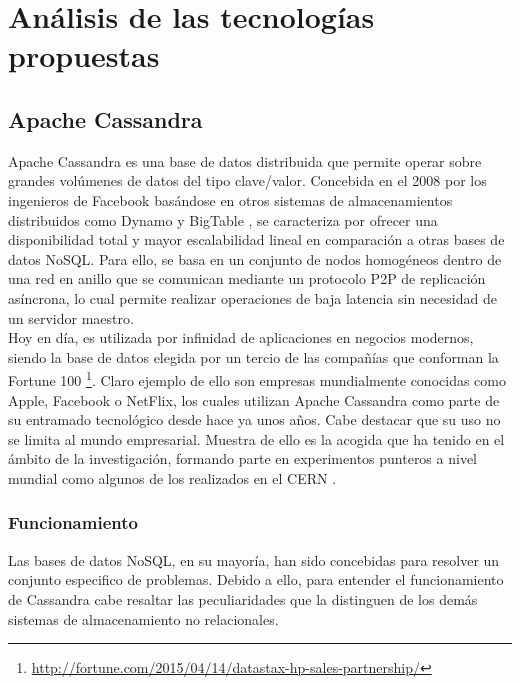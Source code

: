 
\pagestyle{fancy}

\chapter{Análisis de las tecnologías propuestas}
\label{analisis_tecnologias}

\section{Apache Cassandra}

Apache Cassandra es una base de datos distribuida que permite operar sobre grandes volúmenes de datos del tipo clave/valor. Concebida en el 2008 por los ingenieros de Facebook basándose en otros sistemas de almacenamientos distribuidos como Dynamo\cite{decandia2007dynamo} y BigTable \cite{chang2008bigtable}, se caracteriza por ofrecer una  disponibilidad total y mayor escalabilidad lineal en comparación a otras bases de datos NoSQL\cite{nambiartowards}. Para ello, se basa en un conjunto de nodos homogéneos dentro de una red en anillo que se comunican mediante un protocolo P2P de replicación asíncrona, lo cual permite realizar operaciones de baja latencia sin necesidad de un servidor maestro.\\

Hoy en día, es utilizada por infinidad de aplicaciones en negocios modernos, siendo la base de datos elegida por un tercio de las compañías que conforman la Fortune 100 \footnote{\url{http://fortune.com/2015/04/14/datastax-hp-sales-partnership/}}. Claro ejemplo de ello son empresas mundialmente conocidas como Apple, Facebook o NetFlix, los cuales utilizan Apache Cassandra como parte de su entramado tecnológico desde hace ya unos años. Cabe destacar que su uso no se limita al mundo empresarial. Muestra de ello es la acogida que ha tenido en el ámbito de la investigación, formando parte en experimentos punteros a nivel mundial como algunos de los realizados en el CERN \cite{sicoe2012persistent}.

\clearpage

\subsection{Funcionamiento}

Las bases de datos NoSQL, en su mayoría, han sido concebidas para resolver un conjunto especifico de problemas. Debido a ello, para entender el funcionamiento de Cassandra cabe resaltar las peculiaridades que la distinguen de los demás sistemas de almacenamiento no relacionales.

